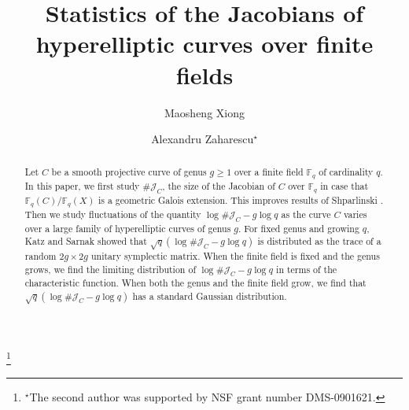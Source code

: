\documentclass[12pt]{amsart}
\theoremstyle{plain}
\newcommand{\F}{{\mathbb F}_q}
\newcommand{\J}{\mathcal J}
\begin{document}

\title[Jacobians of hyperelliptic curves over finite fields]{Statistics of the Jacobians of hyperelliptic curves over finite fields}




\author[Xiong]{Maosheng Xiong}
\author[Zaharescu]{Alexandru Zaharescu$^{\star}$}

\address{Maosheng Xiong: Department of Mathematics \\
Hong Kong University of Science and Technology \\
Clear Water Bay, Kowloon\\
P. R. China}

\address{Alexandru Zaharescu: Institute of Mathematics of the Romanian Academy \\
P.O. Box 1--764, 70700 Bucharest, Romania \\
and Department of Mathematics \\
University of Illinois at Urbana-Champaign \\
273 Altgeld Hall, MC-382 \\
1409 W. Green Street \\
Urbana, IL 61801 USA}



\thanks{$^{\star}$The second author was supported by NSF grant number DMS-0901621.}

\begin{abstract}
Let $C$ be a smooth projective curve of genus $g \ge 1$ over a finite field $\F$ of cardinality $q$. In this paper, we first study $\#\J_C$, the size of the Jacobian of $C$ over $\F$ in case that $\F(C)/\F(X)$ is a geometric Galois extension. This improves results of Shparlinski \cite{shp}. Then we study fluctuations of the quantity $\log \#\J_C-g \log q$ as the curve $C$ varies over a large family of hyperelliptic curves of genus $g$. For fixed genus and growing $q$, Katz and Sarnak showed that $\sqrt{q}\left(\log \# \J_C-g \log q\right)$ is distributed as the trace of a random $2g \times 2g$ unitary symplectic matrix. When the finite field is fixed and the genus grows, we find the limiting distribution of $\log \#\J_C-g \log q$ in terms of the characteristic function. When both the genus and the finite field grow, we find that $\sqrt{q}\left(\log \# \J_C-g \log q\right)$ has a standard Gaussian distribution.

\end{abstract}
\end{document}
